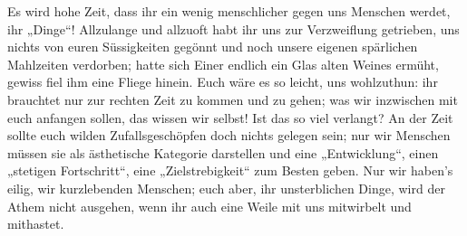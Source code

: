 Es wird hohe Zeit, dass ihr ein wenig menschlicher gegen uns Menschen werdet, ihr „Dinge“! Allzulange und allzuoft habt ihr uns zur Verzweiflung getrieben, uns nichts von euren Süssigkeiten gegönnt und noch unsere eigenen spärlichen Mahlzeiten verdorben; hatte sich Einer endlich ein Glas alten Weines ermüht, gewiss fiel ihm eine Fliege hinein. Euch wäre es so leicht, uns wohlzuthun: ihr brauchtet nur zur rechten Zeit zu kommen und zu gehen; was wir inzwischen mit euch anfangen sollen, das wissen wir selbst! Ist das so viel verlangt? An der Zeit sollte euch wilden Zufallsgeschöpfen doch nichts gelegen sein; nur wir Menschen müssen sie als ästhetische Kategorie darstellen und eine „Entwicklung“, einen „stetigen Fortschritt“, eine „Zielstrebigkeit“ zum Besten geben. Nur wir haben’s eilig, wir kurzlebenden Menschen; euch aber, ihr unsterblichen Dinge, wird der Athem nicht ausgehen, wenn ihr auch eine Weile mit uns mitwirbelt und mithastet.
\par

